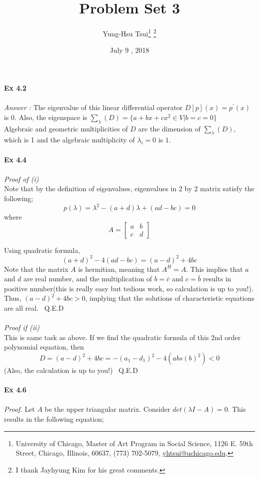 \documentclass[letterpaper,12pt]{article}
\theoremstyle{definition}
\begin{document}
	
	\title{Problem Set 3\\
	}
	\author{
		Yung-Hsu Tsui\footnote{University of Chicago, Master of Art Program in Social Science, 1126 E. 59th Street, Chicago, Illinois, 60637, (773) 702-5079, \href{mailto:}{yhtsui@uchicago.edu}.} \footnote{I thank Jayhyung Kim for his great comments.}\\[-2pt]
	}
	\date{July 9 ,  2018 }
	\vspace{-9mm}
	\maketitle
	\thispagestyle{empty}
	
	\pagestyle{fancy}
	\fancyhf{}
	\cfoot{\thepage}
	
	\begin{spacing}{1.3}{}
		\vspace{1 mm}
		
\textbf{Ex 4.2} \\\\
\emph{Answer : } The eigenvalue of this linear differential operator $D[p](x) = p^{'} (x)$ is $0$. Also, the eigenspace is $ \sum_{\lambda}(D) = \{a + bx + c x^2 \in V | b=c=0\}$ \\
Algebraic and geometric multiplicities of $D$ are the dimension of $ \sum_{\lambda}(D)$, which is 1 and the algebraic multiplicity of $\lambda_i = 0$ is $1$. \\\\
\textbf{Ex 4.4} \\\\
\emph{Proof of (i) } \\
Note that by the definition of eigenvalues, eigenvalues in 2 by 2 matrix satisfy the following;
\[p(\lambda)  = \lambda^2 - (a+d) \lambda + (ad - bc) = 0\]
where
\[A= \begin{bmatrix}
  a & b \\
  c & d
\end{bmatrix}\]

Using quadratic formula,
\[(a+d)^2 - 4(ad - bc) = (a-d)^2 + 4bc \]
Note that the matrix $A$ is hermitian, meaning that $A^H = A$. This implies that $a$ and $d$ are real number, and the multiplication of $b=\bar{c}$ and $c=\bar{b}$ results in positive number(this is really easy but tedious  work, so calculation is up to you!). Thus, $(a-d)^2 + 4bc >0$, implying that the solutions of characteristic equations are all real. \ Q.E.D\\\\
\emph{Proof if (ii)} \\
This is same task as above. If we find the quadratic formula of this 2nd order polynomial equation, then
\[D = (a-d)^2 + 4bc = -(a_1 - d_1)^2 - 4(abs(b)^2) < 0 \]
(Also, the calculation is up to you!) \ Q.E.D \\\\
\textbf{Ex 4.6} \\\\
\emph{Proof.} Let $A$ be the upper triangular matrix. Consider $det(\lambda I - A) = 0 $. This results in the following equation;


\end{spacing}
\end{document}
